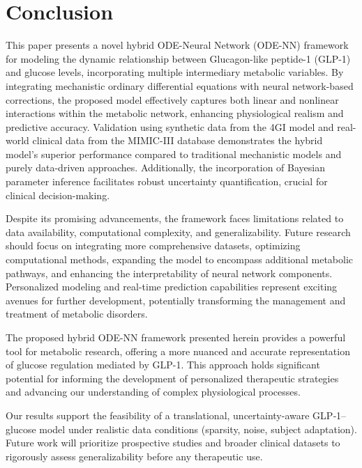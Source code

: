 \documentclass[9pt,shortpaper,twoside,web]{ieeecolor}
\begin{document}
\section{Conclusion}
\label{sec:conclusion}

This paper presents a novel hybrid ODE-Neural Network (ODE-NN) framework for modeling the dynamic relationship between Glucagon-like peptide-1 (GLP-1) and glucose levels, incorporating multiple intermediary metabolic variables. By integrating mechanistic ordinary differential equations with neural network-based corrections, the proposed model effectively captures both linear and nonlinear interactions within the metabolic network, enhancing physiological realism and predictive accuracy. Validation using synthetic data from the 4GI model and real-world clinical data from the MIMIC-III database demonstrates the hybrid model's superior performance compared to traditional mechanistic models and purely data-driven approaches. Additionally, the incorporation of Bayesian parameter inference facilitates robust uncertainty quantification, crucial for clinical decision-making.

Despite its promising advancements, the framework faces limitations related to data availability, computational complexity, and generalizability. Future research should focus on integrating more comprehensive datasets, optimizing computational methods, expanding the model to encompass additional metabolic pathways, and enhancing the interpretability of neural network components. Personalized modeling and real-time prediction capabilities represent exciting avenues for further development, potentially transforming the management and treatment of metabolic disorders.

The proposed hybrid ODE-NN framework presented herein provides a powerful tool for metabolic research, offering a more nuanced and accurate representation of glucose regulation mediated by GLP-1. This approach holds significant potential for informing the development of personalized therapeutic strategies and advancing our understanding of complex physiological processes.

Our results support the feasibility of a translational, uncertainty-aware GLP‑1–glucose model under realistic data conditions (sparsity, noise, subject adaptation). Future work will prioritize prospective studies and broader clinical datasets to rigorously assess generalizability before any therapeutic use.
\end{document}

